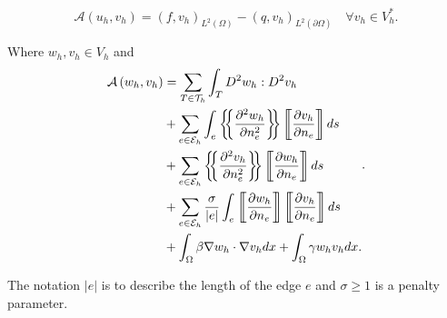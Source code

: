 \begin{equation}
\label{eq:C0-methoda}
\mathcal{A} \left( u_{h}, v_{h}  \right) = \left( f, v_{h} \right)_{L^{2}\left( \Omega  \right)} - \left( q, v_{h}
\right) _{L^{2}\left( \partial \Omega  \right)} \quad  \forall v_{h} \in V_{h}^{*}
.\end{equation}

Where $w_{h}, v_{h} \in  V_{h}$ and
\begin{equation}
\label{eq:C0-methodb}
\begin{split}
    \mathcal{A} \left( w_{h}, v_{h} \right) &=  \sum_{T \in \mathcal{T} _{h}}^{} \int_{T}^{} D^2 w_{h} : D^2 v_{h}  \\
    & + \sum_{e \in  \mathcal{E} _{h}}^{} \int_{e}^{ } \mean{ \frac{\partial ^2 w _{h}}{\partial n_{e}^2 } } \jump{
    \frac{\partial v_{h}}{\partial  n_{e}} }  ds \\
    & + \sum_{e \in \mathcal{E} _{h}}^{} \mean{ \frac{\partial ^2
v_{h}}{\partial n_{e }^2 } } \jump{ \frac{\partial w_{h}}{\partial n_{e}} }  ds \\
 &  + \sum_{e \in \mathcal{E} _{h}}^{} \frac{\sigma }{\left\lvert e \right\rvert } \int_{e}^{} \jump{ \frac{\partial
 w_{h}}{\partial n_{e}}} \jump{ \frac{\partial v_{h}}{\partial n_{e}} } ds \\
 & + \int_{\Omega }^{}  \beta \nabla w_{h} \cdot \nabla v_{h} dx + \int_{\Omega }^{} \gamma w_{h} v_{h} dx .
\end{split}
.\end{equation}

The notation $\left\lvert e \right\rvert $ is to describe the length of the edge $e$ and $\sigma  \ge  1$ is a penalty
parameter. 


